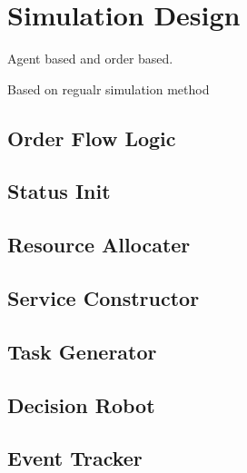\section{Simulation Design}
Agent based and order based.

Based on regualr simulation method 
\subsection{Order Flow Logic} %
\label{sub:order_flow_logic}


\subsection{Status Init} %
\label{sub:status_init}


\subsection{Resource Allocater} %
\label{sub:resource_allocation}


\subsection{Service Constructor} %
\label{sub:service_constructor}


\subsection{Task Generator} %
\label{sub:task_generator}


\subsection{Decision Robot} %
\label{sub:decision_robot}


\subsection{Event Tracker} %
\label{sub:event_tracker}


